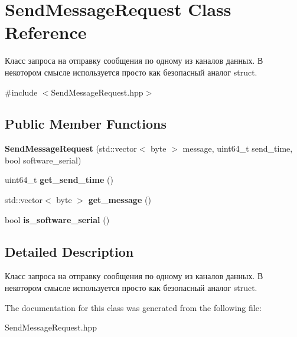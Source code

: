 \hypertarget{classSendMessageRequest}{}\section{Send\+Message\+Request Class Reference}
\label{classSendMessageRequest}


Класс запроса на отправку сообщения по одному из каналов данных.  В некотором смысле используется просто как безопасный аналог struct.  




{\ttfamily \#include $<$Send\+Message\+Request.\+hpp$>$}

\subsection*{Public Member Functions}
\begin{DoxyCompactItemize}
\item 
\mbox{\label{classSendMessageRequest_a95d1d5f9f5ba86cd19f7cf8ff4ac4f47}} 
{\bfseries Send\+Message\+Request} (std\+::vector$<$ byte $>$ message, uint64\+\_\+t send\+\_\+time, bool software\+\_\+serial)
\item 
\mbox{\label{classSendMessageRequest_a437a9ee34d56ccf83474995cea676bef}} 
uint64\+\_\+t {\bfseries get\+\_\+send\+\_\+time} ()
\item 
\mbox{\label{classSendMessageRequest_a3ffcb2a4b80b82ed3ec42c2cc373c966}} 
std\+::vector$<$ byte $>$ {\bfseries get\+\_\+message} ()
\item 
\mbox{\label{classSendMessageRequest_a54501a4ff0346ad99921dda990ffa179}} 
bool {\bfseries is\+\_\+software\+\_\+serial} ()
\end{DoxyCompactItemize}


\subsection{Detailed Description}
Класс запроса на отправку сообщения по одному из каналов данных.  В некотором смысле используется просто как безопасный аналог struct. 

The documentation for this class was generated from the following file\+:\begin{DoxyCompactItemize}
\item 
Send\+Message\+Request.\+hpp\end{DoxyCompactItemize}
